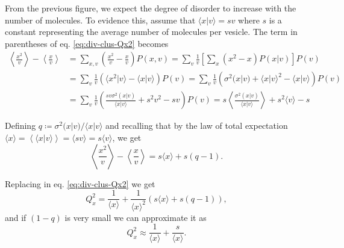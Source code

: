 From the previous figure, we expect the degree of disorder to increase with the number of molecules. To evidence this, assume that $\langle x|v\rangle = sv$ where $s$ is a constant representing the average number of molecules per vesicle. The term in parentheses of eq. \eqref{eq:div-clus-Qx2} becomes
\begin{equation*}
  \begin{split}
    \left\langle \frac{x^2}{v}\right\rangle-\left\langle \frac{x}{v}\right\rangle &= \sum_{x,v}\left( \frac{x^2}{v}- \frac{x}{v}\right)P(x,v) = \sum_v\frac{1}{v}\left[\sum_x\left(x^2- x\right)P(x|v)\right]P(v)\\
    &=\sum_v\frac{1}{v}\left(\langle x^2|v\rangle - \langle x|v\rangle\right)P(v)=\sum_v\frac{1}{v}\left(\sigma^2(x|v) + \langle x|v\rangle^2-\langle x|v\rangle\right)P(v)\\
    &=\sum_v\frac{1}{v}\left(\frac{sv\sigma^2(x|v)}{\langle x|v\rangle} + s^2v^2-sv\right)P(v) = s\left\langle\frac{\sigma^2(x|v)}{\langle x|v\rangle}\right\rangle + s^2\langle v\rangle - s
  \end{split}
\end{equation*}

Defining $q\coloneqq\sigma^2(x|v)/\langle x|v\rangle$ and recalling that by the law of total expectation $\langle x\rangle = \left\langle\langle x|v\rangle\right\rangle = \langle sv\rangle =s\langle v\rangle$, we get
\begin{equation*}
  \left\langle \frac{x^2}{v}\right\rangle-\left\langle \frac{x}{v}\right\rangle = s\langle x\rangle+s(q-1).
\end{equation*}

Replacing in eq. \eqref{eq:div-clus-Qx2} we get
\begin{equation*}
  Q_x^2 = \frac{1}{\langle x\rangle} + \frac{1}{\langle x\rangle^2}\left(s\langle x\rangle+s(q-1)\right),
\end{equation*}
and if $(1-q)$ is very small we can approximate it as
\begin{equation}
  \label{eq:Rclust2}
  Q_x^2 \approx \frac{1}{\langle x\rangle} + \frac{s}{\langle x\rangle}.
\end{equation}

